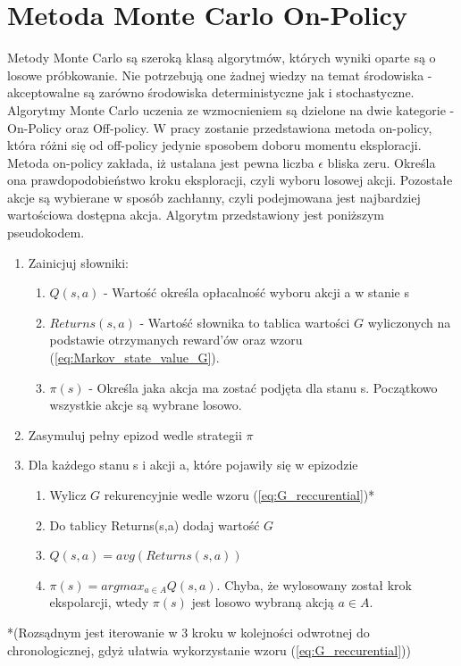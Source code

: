 \documentclass[12pt]{book}
\theoremstyle{plain}
\begin{document}
\section{Metoda Monte Carlo On-Policy}
Metody Monte Carlo są szeroką klasą algorytmów, których wyniki oparte są o losowe próbkowanie. Nie potrzebują one żadnej wiedzy na temat środowiska - akceptowalne są zarówno środowiska deterministyczne jak i stochastyczne. Algorytmy Monte Carlo uczenia ze wzmocnieniem są dzielone na dwie kategorie - On-Policy oraz Off-policy. W pracy zostanie przedstawiona metoda on-policy, która różni się od off-policy jedynie sposobem doboru momentu eksploracji. Metoda on-policy zakłada, iż ustalana jest pewna liczba $\epsilon$ bliska zeru. Określa ona prawdopodobieństwo kroku eksploracji, czyli wyboru losowej akcji. Pozostałe akcje są wybierane w sposób zachłanny, czyli podejmowana jest najbardziej wartościowa dostępna akcja. Algorytm przedstawiony jest poniższym pseudokodem.
\begin{enumerate}
	\item Zainicjuj słowniki:
	\begin{enumerate}
		\item $Q(s,a)$ - Wartość określa opłacalność wyboru akcji a w stanie s
		\item $Returns(s,a)$ - Wartość słownika to tablica wartości $G$ wyliczonych na podstawie otrzymanych reward'ów oraz wzoru (\ref{eq:Markov_state_value_G}).
		\item $\pi(s)$ - Określa jaka akcja ma zostać podjęta dla stanu s. Początkowo wszystkie akcje są wybrane losowo.
	\end{enumerate}
	\item Zasymuluj pełny epizod wedle strategii $\pi$
	\item Dla każdego stanu s i akcji a, które pojawiły się w epizodzie
	\begin{enumerate}
		\item Wylicz $G$ rekurencyjnie wedle wzoru (\ref{eq:G_reccurential})*
		\item Do tablicy Returns(s,a) dodaj wartość $G$
		\item $Q(s,a)=avg(Returns(s,a))$
		\item $\pi(s)=argmax_{a\in{A}}Q(s,a)$. Chyba, że wylosowany został krok ekspolarcji, wtedy $\pi(s)$ jest losowo wybraną akcją $a \in A$.
	\end{enumerate}
\end{enumerate}
*(Rozsądnym jest iterowanie w 3 kroku w kolejności odwrotnej do chronologicznej, gdyż ułatwia wykorzystanie wzoru (\ref{eq:G_reccurential}))
\end{document}
